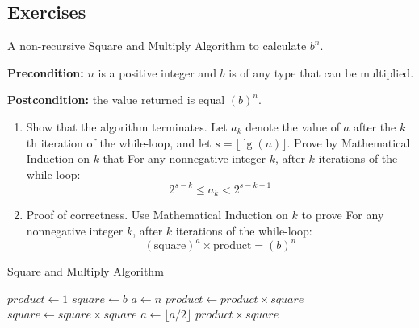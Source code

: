 \documentclass[
	12pt, %
	fleqn, %
	a4paper, %
]{LegrandOrangeBook}
\begin{document}
\subsection{Exercises}
\begin{exercise}
    A non-recursive Square and Multiply Algorithm to calculate \( b^n \).

\textbf{Precondition:} \( n \) is a positive integer and \( b \) is of any type that can be multiplied.

\textbf{Postcondition:} the value returned is equal \( (b)^n \).

\begin{enumerate}
    \item Show that the algorithm terminates. Let \( a_k \) denote the value of \( a \) after the \( k \)th iteration of the while-loop, and let \( s = \lfloor \lg(n) \rfloor \). Prove by Mathematical Induction on \( k \) that For any nonnegative integer \( k \), after \( k \) iterations of the while-loop:
    $$2^{s-k} \le a_k < 2^{s-k+1}$$
    \item  Proof of correctness. Use Mathematical Induction on \( k \) to prove For any nonnegative integer \( k \), after \( k \) iterations of the while-loop:
\[ (\text{square})^a \times \text{product} = (b)^n \]
\end{enumerate}
\end{exercise}
\begin{algorithm}
    \caption{Square and Multiply Algorithm}
    \begin{algorithmic}[1]
    \State $product \gets 1$
    \State $square \gets b$
    \State $a \gets n$
         
            \State $product \gets product \times square$
        \EndIf
        \State $square \gets square \times square$
        \State $a \gets \lfloor a / 2 \rfloor$ 
    \EndWhile
    \State \Return $product \times square$
    \end{algorithmic}
\end{algorithm}
\end{document}
